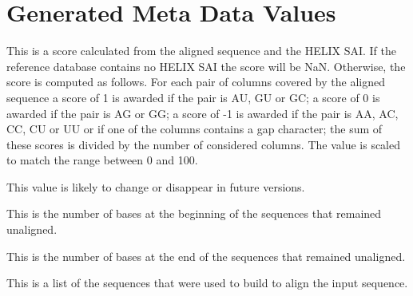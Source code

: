 \documentclass[english,a4paper]{article}
\begin{document}
\section{Generated Meta Data Values}
\begin{Description}
\item[\Arg{align\_bp\_score\_slv}]
  This is a score calculated from the aligned sequence and the HELIX SAI. If the reference database
  contains no HELIX SAI the score will be NaN. Otherwise, the score is computed as follows. For each
  pair of columns covered by the aligned sequence a score of 1 is awarded if the pair is AU, GU or GC;
  a score of 0 is awarded if the pair is AG or GG; a score of -1 is awarded if the pair is AA, AC, CC,
  CU or UU or if one of the columns contains a gap character; the sum of these scores is divided by
  the number of considered columns. The value is scaled to match the range between 0 and 100.

  This value is likely to change or disappear in future versions.
\item[\Arg{align\_cutoff\_head\_slv}]
  This is the number of bases at the beginning of the sequences that remained unaligned.

\item[\Arg{align\_cutoff\_tail\_slv}]
  This is the number of bases at the end of the sequences that remained unaligned.

\item[\Arg{align\_family\_slv}]
  This is a list of the sequences that were used to build to align the input sequence.


\end{Description}
\end{document}
